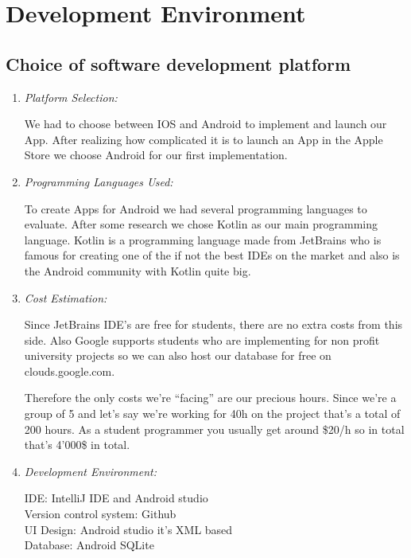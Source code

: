 \documentclass[conference]{IEEEtran}
\begin{document}
\section{Development Environment}

\subsection{Choice of software development platform}
\begin{enumerate}
    \item \textit{Platform Selection:} \par
    We had to choose between IOS and Android to implement and launch our App. After realizing how complicated it is to launch an App in the Apple Store we choose Android for our first implementation. \\
    \item \textit{Programming Languages Used:} \par
    To create Apps for Android we had several programming languages to evaluate. After some research we chose Kotlin as our main programming language. Kotlin is a programming language made from JetBrains who is famous for creating one of the if not the best IDEs on the market and also is the Android community with Kotlin quite big.\\
    \item \textit{Cost Estimation:} \par
    Since JetBrains IDE’s are free for students, there are no extra costs from this side. Also Google supports students who are implementing for non profit university projects so we can also host our database for free on clouds.google.com.\par
    Therefore the only costs we’re “facing” are our precious hours.
    Since we’re a group of 5 and let’s say we’re working for 40h on the project that’s a total of 200 hours. As a student programmer you usually get around \$20/h so in total that’s 4’000\$ in total.\\
    \item \textit{Development Environment:} \par
    IDE:  IntelliJ IDE and Android studio\\
	Version control system:  Github\\
	UI Design: 	 Android studio it’s XML based\\
	Database:  Android SQLite\\
\end{enumerate}
	
\end{document}
